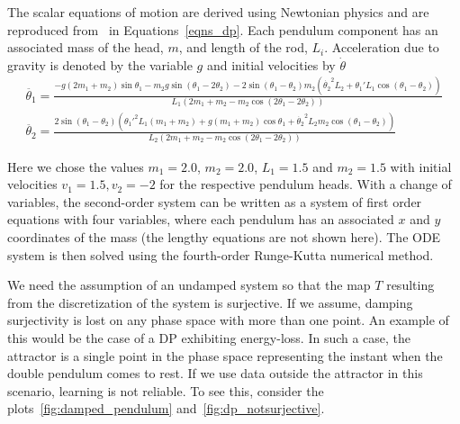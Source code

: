 The scalar equations of motion are derived using Newtonian physics and are reproduced from~\cite{DPFormulas} in Equations~\ref{eqns_dp}. 
Each pendulum component has an associated mass of the head, $m$, and length of the rod, $L_i$. Acceleration due to gravity is denoted by the variable $g$ and initial velocities by $\dot{\theta}$
\begin{eqnarray}\label{eqns_dp}
  \ddot{\theta_{1}}  = \frac{-g(2m_1+m_2)\sin{\theta_1} - m_2g\sin(\theta_1-2\theta_2) - 2\sin(\theta_1-\theta_2)m_2({\dot{\theta_{2}}}^{2}L_2 + {\theta_{1}'}L_1\cos(\theta_1-\theta_2))} {L_1(2m_1 + m_2 -m_2\cos(2\theta_1 - 2\theta_2))}
  \\
  \ddot{\theta_{2}} = \frac{2\sin(\theta_1-\theta_2)(\theta_{1}'^{2}L_1(m_1+m_2) + g(m_1+m_2)\cos\theta_1 + \dot{\theta_{2}}^{2}L_2m_2\cos(\theta_1-\theta_2))}{L_2(2m_1 + m_2 -m_2\cos(2\theta_1 - 2\theta_2))}
\end{eqnarray}

Here we chose the values $m_1=2.0$, $m_2=2.0$, $L_1=1.5$ and $m_2=1.5$ with initial velocities $v_1=1.5, v_2=-2$ for the respective pendulum heads.
With a change of variables, the second-order system can be written as a system of first order equations with four variables, where each pendulum has an associated $x$ and $y$ coordinates of the mass (the lengthy equations are not shown here). 
The ODE system is then solved using the fourth-order Runge-Kutta numerical method.  


We need the assumption of an undamped system so that the map $T$ resulting from the discretization of the system  is surjective.  If we assume, damping surjectivity is lost on any phase space with more than one point.  
An example of this would be the case of a DP exhibiting energy-loss. In such a case, the attractor is a single point in the phase space representing the instant when the double pendulum comes to rest. 
If we use data outside the attractor in this scenario, learning is not reliable. To see this, consider the plots~\ref{fig:damped_pendulum} and~\ref{fig:dp_notsurjective}.

